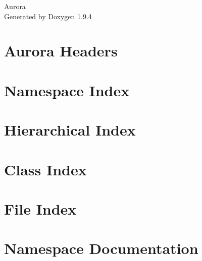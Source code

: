 \documentclass[twoside]{book}
\newcommand{\+}{\discretionary{\mbox{\scriptsize$\hookleftarrow$}}{}{}}
\newcommand{\clearemptydoublepage}{%
    \newpage{\pagestyle{empty}\cleardoublepage}%
  }
\begin{document}
  \raggedbottom
    \hypersetup{pageanchor=false,
                bookmarksnumbered=true,
                pdfencoding=unicode
               }
  \begin{titlepage}
  \vspace*{7cm}
  \begin{center}%
  {\Large Aurora}\\
  \vspace*{1cm}
  {\large Generated by Doxygen 1.9.4}\\
  \end{center}
  \end{titlepage}
  \clearemptydoublepage
  \tableofcontents
  \clearemptydoublepage
  \hypersetup{pageanchor=true}
\chapter{Aurora Headers}
\label{index}\hypertarget{index}{}
\chapter{Namespace Index}

\chapter{Hierarchical Index}

\chapter{Class Index}

\chapter{File Index}

\chapter{Namespace Documentation}

\end{document}
